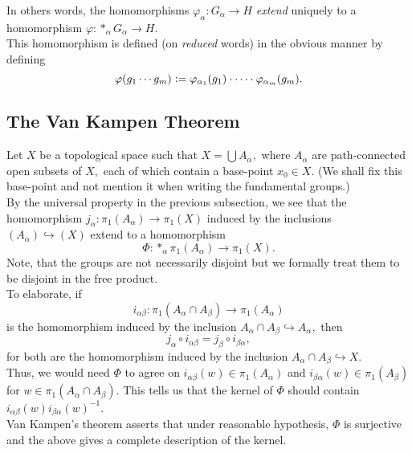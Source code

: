 \documentclass[12pt]{article}
\begin{document}
In others words, the homomorphisms $\varphi_\alpha:G_\alpha \to H$ \emph{extend} uniquely to a homomorphism $\varphi:*_\alpha G_\alpha \to H.$\\
This homomorphism is defined (on \emph{reduced} words) in the obvious manner by defining
\begin{equation*} 
	\varphi(g_1\cdots g_m) \vcentcolon= \varphi_{\alpha_1}(g_1)\cdot\cdots\cdot\varphi_{\alpha_m}(g_m).
\end{equation*}
%
%
%
\subsection{The Van Kampen Theorem}
Let $X$ be a topological space such that $X = \bigcup A_\alpha,$ where $A_\alpha$ are path-connected open subsets of $X,$ each of which contain a base-point $x_0 \in X.$ (We shall fix this base-point and not mention it when writing the fundamental groups.) \\
By the universal property in the previous subsection, we see that the homomorphism $j_\alpha:\pi_1(A_\alpha) \to \pi_1(X)$ induced by the inclusions $(A_\alpha) \hookrightarrow (X)$ extend to a homomorphism
\begin{equation*} 
	\Phi:*_\alpha\pi_1(A_\alpha) \to \pi_1(X).
\end{equation*}
Note, that the groups are not necessarily disjoint but we formally treat them to be disjoint in the free product.\\
To elaborate, if
\begin{equation*} 
	i_{\alpha\beta}:\pi_1(A_\alpha \cap A_\beta) \to \pi_1(A_\alpha)
\end{equation*}
is the homomorphism induced by the inclusion $A_\alpha\cap A_\beta \hookrightarrow A_\alpha,$ then
\begin{equation*} 
	j_{\alpha}\circ i_{\alpha\beta} = j_\beta\circ i_{\beta\alpha},
\end{equation*}
for both are the homomorphism induced by the inclusion $A_\alpha\cap A_\beta \hookrightarrow X.$\\
Thus, we would need $\Phi$ to agree on $i_{\alpha\beta}(w) \in \pi_1(A_\alpha)$ and $i_{\beta\alpha}(w) \in \pi_1(A_\beta)$ for $w \in \pi_1(A_\alpha\cap A_\beta).$ This tells us that the kernel of $\Phi$ should contain $i_{\alpha\beta}(w)i_{\beta\alpha}(w)^{-1}.$\\
Van Kampen's theorem asserts that under reasonable hypothesis, $\Phi$ is surjective and the above gives a complete description of the kernel.
\end{document}
